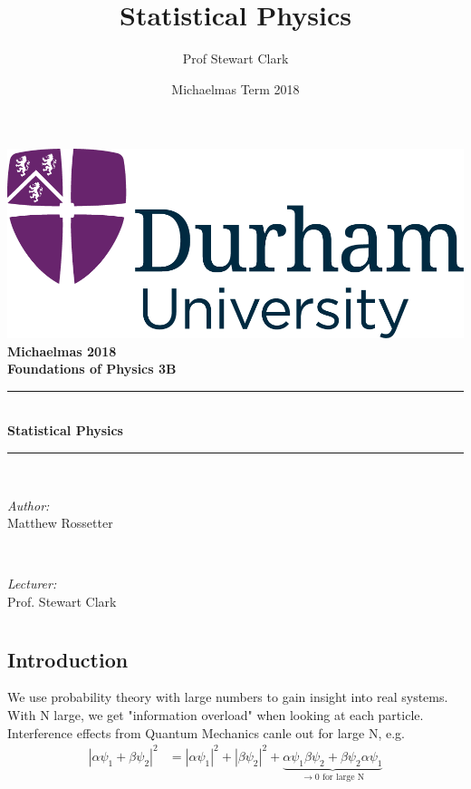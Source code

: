 \documentclass[a4paper, 11pt, normalem]{report}
\title{Statistical Physics \vspace{-20pt}}
\author{Prof Stewart Clark}
\date{\vspace{-15pt}Michaelmas Term 2018}
\begin{document}
\begin{titlepage}
    \newcommand{\HRule}{\rule{\linewidth}{0.5mm}}
    \center
    {\includegraphics[scale=0.5]{../../logo0.png}\hfill{\Large\bfseries Michaelmas 2018}}\\[2.5cm]
    {\LARGE\bfseries Foundations of Physics 3B}\\[1.5cm]
    \HRule \\[0.7cm]
    {\huge\bfseries Statistical Physics}\\[0.4cm]
    \HRule \\[1.5cm]

    \begin{minipage}{0.4\textwidth}
        \begin{flushleft} \large
            \emph{Author:} \\ Matthew Rossetter
        \end{flushleft}
    \end{minipage}~
    \begin{minipage}{0.4\textwidth}
        \begin{flushright} \large
            \emph{Lecturer:} \\ Prof. Stewart Clark
        \end{flushright}
    \end{minipage}
    \vfill
\end{titlepage}

\chapter{}
\section{Introduction}
We use probability theory with large numbers to gain insight into real systems.
With N large, we get "information overload" when looking at each particle.
Interference effects from Quantum Mechanics canle out for large N, e.g.
\begin{align}
    |\alpha\psi_1 + \beta\psi_2|^2 &= |\alpha\psi_1|^2 + |\beta\psi_2|^2 + \underbrace{\alpha\psi_1\beta\psi_2 + \beta\psi_2\alpha\psi_1}_{\to 0 \text{ for large N}}
\end{align}
\end{document}
